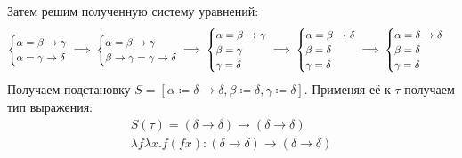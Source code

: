 \begin{example}
\begin{center}
    \end{center}
    Затем решим полученную систему уравнений:
    \[
        \begin{cases}
            \alpha=\beta\rightarrow\gamma \\
            \alpha=\gamma\rightarrow\delta
        \end{cases} \mkern-18mu
        \implies
        \begin{cases}
            \alpha=\beta\rightarrow\gamma \\
            \beta\rightarrow\gamma=\gamma\rightarrow\delta
        \end{cases} \mkern-18mu
        \implies
        \begin{cases}
            \alpha=\beta\rightarrow\gamma \\
            \beta=\gamma \\
            \gamma=\delta
        \end{cases} \mkern-18mu
        \implies
        \begin{cases}
            \alpha=\beta\rightarrow\delta \\
            \beta=\delta \\
            \gamma=\delta
        \end{cases} \mkern-18mu
        \implies
        \begin{cases}
            \alpha=\delta\rightarrow\delta \\
            \beta=\delta \\
            \gamma=\delta
        \end{cases}
    \]
    Получаем подстановку $S = \left[\alpha\coloneqq\delta\rightarrow\delta, \beta\coloneqq\delta, \gamma\coloneqq\delta\right]$.
    Применяя её к $\tau$ получаем тип выражения:
    \begin{gather*}
        S(\tau) = (\delta\rightarrow\delta)\rightarrow(\delta\rightarrow\delta) \\
        \lambda f \lambda x . f (f x) : (\delta\rightarrow\delta)\rightarrow(\delta\rightarrow\delta)
    \end{gather*}
\end{example}

%
